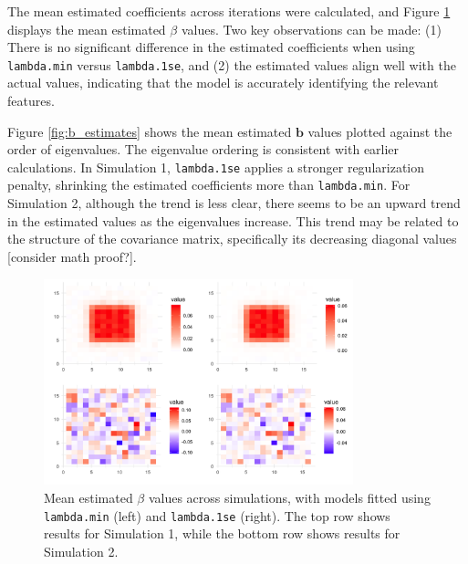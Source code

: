 \documentclass[12pt]{article}
\begin{document}
The mean estimated coefficients across iterations were calculated, and Figure \ref{fig:beta_estimates} displays the mean estimated \( \beta \) values. Two key observations can be made: (1) There is no significant difference in the estimated coefficients when using \texttt{lambda.min} versus \texttt{lambda.1se}, and (2) the estimated values align well with the actual values, indicating that the model is accurately identifying the relevant features.

Figure \ref{fig:b_estimates} shows the mean estimated \( \mathbf{b} \) values plotted against the order of eigenvalues. The eigenvalue ordering is consistent with earlier calculations. In Simulation 1, \texttt{lambda.1se} applies a stronger regularization penalty, shrinking the estimated coefficients more than \texttt{lambda.min}. For Simulation 2, although the trend is less clear, there seems to be an upward trend in the estimated values as the eigenvalues increase. This trend may be related to the structure of the covariance matrix, specifically its decreasing diagonal values [consider math proof?].

\begin{figure}[H]
	\centering
	\includegraphics[width=0.8\textwidth]{beta_estimates.png}
	\caption{Mean estimated \( \beta \) values across simulations, with models fitted using \texttt{lambda.min} (left) and
		\texttt{lambda.1se} (right). The top row shows results for Simulation 1, while the bottom row shows results for Simulation 2.}
	\label{fig:beta_estimates}
\end{figure}
\end{document}
